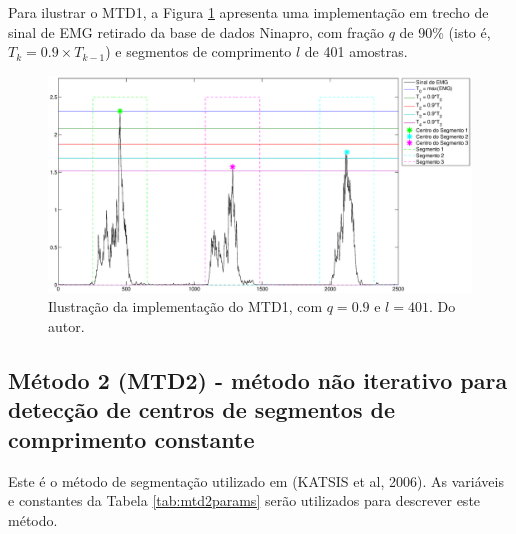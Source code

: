 \documentclass[
	12pt,				%
	openright,			%
	oneside,
	a4paper,			%
	english,			%
	francais,			%
	spanish,			%
	brazil				%
	]{abntex2}
\begin{document}
	Para ilustrar o MTD1, a Figura \ref{fig:mtd1example} apresenta uma implementação em trecho de sinal de EMG retirado da base de dados Ninapro, com fração $q$ de 90\% (isto é, $T_k = 0.9\times T_{k-1}$) e segmentos de comprimento $l$ de 401 amostras.
 
\begin{figure}
\centering
\includegraphics[width=\linewidth]{./img/mtd1example.eps}
\caption{Ilustração da implementação do MTD1, com $q = 0.9$ e $l = 401$. Do autor.}
\label{fig:mtd1example}
\end{figure}
 
\subsection{Método 2 (MTD2) - método não iterativo para detecção de centros de segmentos de comprimento constante}
	Este é o método de segmentação utilizado em (KATSIS et al, 2006). As variáveis e constantes da Tabela \ref{tab:mtd2params} serão utilizados para descrever este método. 
	
\begin{table}[htb]
\end{table}
	
\end{document}
